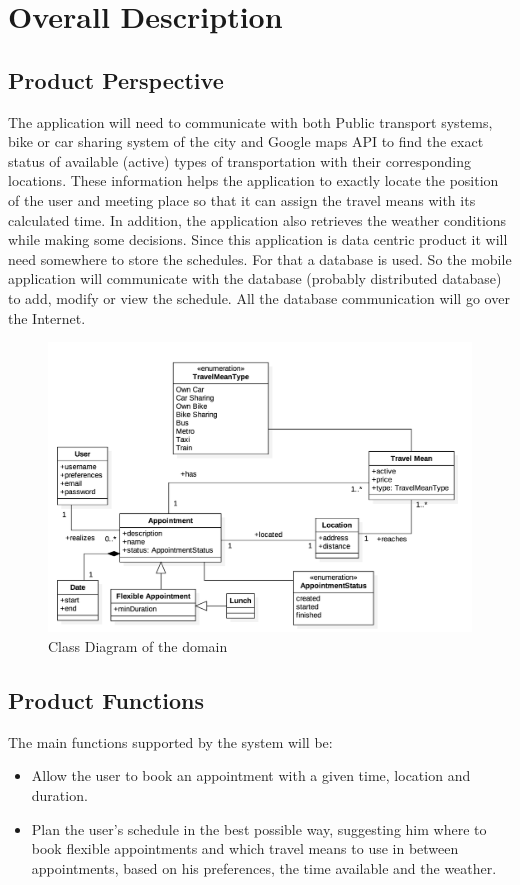\documentclass[12pt]{article}
\begin{document}
\section{Overall Description}

\subsection{Product Perspective}
The application will need to communicate with both Public transport systems, bike or car sharing system of the city and Google maps API to find the exact status of available (active) types of transportation with their corresponding locations. These information helps the application to exactly locate the position of the user and meeting place so that it can assign the travel means with its calculated time. In addition, the application also retrieves the weather conditions while making some decisions. 
Since this application is data centric product it will need somewhere to store the schedules. For that a database is used. So the mobile application will communicate with the database (probably distributed database) to add, modify or view the schedule. All the database communication will go over the Internet.
    \begin{figure}[H]
        \includegraphics[scale=0.485]{domainModel.png}
        \caption{Class Diagram of the domain}
        \centering
    \label{fig:domainModel}
    \end{figure}
    
\subsection{Product Functions}
The main functions supported by the system will be:
\begin{itemize}
    \item Allow the user to book an appointment with a given time, location and duration.
    \item Plan the user's schedule in the best possible way, suggesting him where to book flexible appointments and which travel means to use in between appointments, based on his preferences, the time available and the weather.
\end{itemize}
\end{document}
